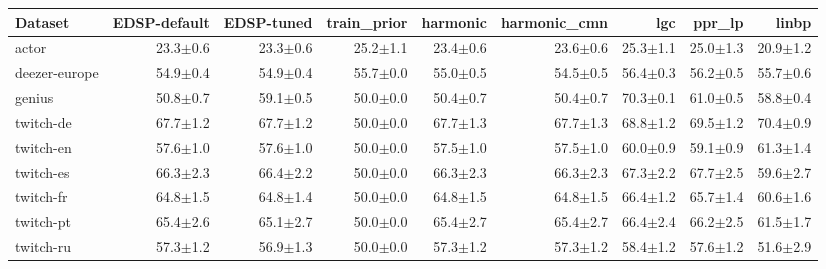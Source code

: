 \begin{tabular}{lrrrrrrrr}
\toprule
Dataset & EDSP-default & EDSP-tuned & train\_prior & harmonic & harmonic\_cmn & lgc & ppr\_lp & linbp \\
\midrule
actor & 23.3$\pm$0.6 & 23.3$\pm$0.6 & 25.2$\pm$1.1 & 23.4$\pm$0.6 & 23.6$\pm$0.6 & 25.3$\pm$1.1 & 25.0$\pm$1.3 & 20.9$\pm$1.2 \\
deezer-europe & 54.9$\pm$0.4 & 54.9$\pm$0.4 & 55.7$\pm$0.0 & 55.0$\pm$0.5 & 54.5$\pm$0.5 & 56.4$\pm$0.3 & 56.2$\pm$0.5 & 55.7$\pm$0.6 \\
genius & 50.8$\pm$0.7 & 59.1$\pm$0.5 & 50.0$\pm$0.0 & 50.4$\pm$0.7 & 50.4$\pm$0.7 & 70.3$\pm$0.1 & 61.0$\pm$0.5 & 58.8$\pm$0.4 \\
twitch-de & 67.7$\pm$1.2 & 67.7$\pm$1.2 & 50.0$\pm$0.0 & 67.7$\pm$1.3 & 67.7$\pm$1.3 & 68.8$\pm$1.2 & 69.5$\pm$1.2 & 70.4$\pm$0.9 \\
twitch-en & 57.6$\pm$1.0 & 57.6$\pm$1.0 & 50.0$\pm$0.0 & 57.5$\pm$1.0 & 57.5$\pm$1.0 & 60.0$\pm$0.9 & 59.1$\pm$0.9 & 61.3$\pm$1.4 \\
twitch-es & 66.3$\pm$2.3 & 66.4$\pm$2.2 & 50.0$\pm$0.0 & 66.3$\pm$2.3 & 66.3$\pm$2.3 & 67.3$\pm$2.2 & 67.7$\pm$2.5 & 59.6$\pm$2.7 \\
twitch-fr & 64.8$\pm$1.5 & 64.8$\pm$1.4 & 50.0$\pm$0.0 & 64.8$\pm$1.5 & 64.8$\pm$1.5 & 66.4$\pm$1.2 & 65.7$\pm$1.4 & 60.6$\pm$1.6 \\
twitch-pt & 65.4$\pm$2.6 & 65.1$\pm$2.7 & 50.0$\pm$0.0 & 65.4$\pm$2.7 & 65.4$\pm$2.7 & 66.4$\pm$2.4 & 66.2$\pm$2.5 & 61.5$\pm$1.7 \\
twitch-ru & 57.3$\pm$1.2 & 56.9$\pm$1.3 & 50.0$\pm$0.0 & 57.3$\pm$1.2 & 57.3$\pm$1.2 & 58.4$\pm$1.2 & 57.6$\pm$1.2 & 51.6$\pm$2.9 \\
\bottomrule
\end{tabular}
